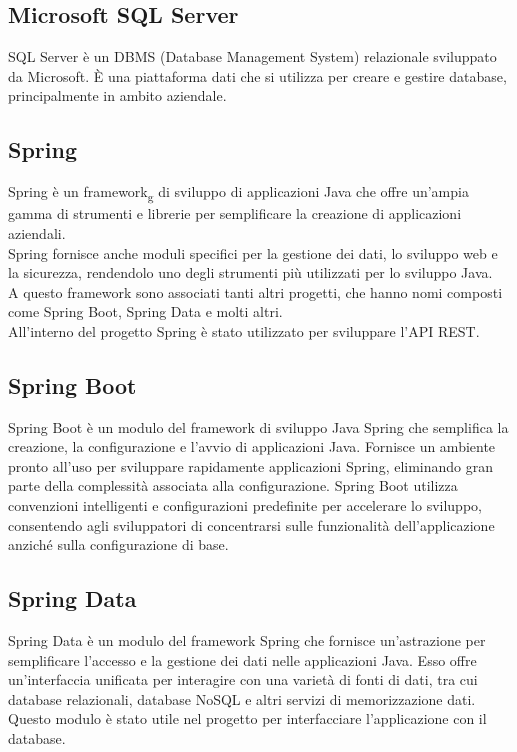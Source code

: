\subsection*{Microsoft SQL Server}
SQL Server è un DBMS (Database Management System) relazionale sviluppato da Microsoft. È una piattaforma dati che si utilizza per creare e gestire database, principalmente in ambito aziendale.\\

\subsection*{Spring}
Spring è un framework\textsubscript{g} di sviluppo di applicazioni Java che offre un'ampia gamma di strumenti e librerie per semplificare la creazione di applicazioni aziendali.\\
Spring fornisce anche moduli specifici per la gestione dei dati, lo sviluppo web e la sicurezza, rendendolo uno degli strumenti più utilizzati per lo sviluppo Java.\\
A questo framework sono associati tanti altri progetti, che hanno nomi composti come Spring Boot, Spring Data e molti altri.\\
All'interno del progetto Spring è stato utilizzato per sviluppare l'API REST.
\\

\subsection*{Spring Boot}
Spring Boot è un modulo del framework di sviluppo Java Spring che semplifica la creazione, la configurazione e l'avvio di applicazioni Java. Fornisce un ambiente pronto all'uso per sviluppare rapidamente applicazioni Spring, eliminando gran parte della complessità associata alla configurazione. Spring Boot utilizza convenzioni intelligenti e configurazioni predefinite per accelerare lo sviluppo, consentendo agli sviluppatori di concentrarsi sulle funzionalità dell'applicazione anziché sulla configurazione di base.
\\

\subsection*{Spring Data}
Spring Data è un modulo del framework Spring che fornisce un'astrazione per semplificare l'accesso e la gestione dei dati nelle applicazioni Java. Esso offre un'interfaccia unificata per interagire con una varietà di fonti di dati, tra cui database relazionali, database NoSQL e altri servizi di memorizzazione dati.\\
Questo modulo è stato utile nel progetto per interfacciare l'applicazione con il database.
\\

